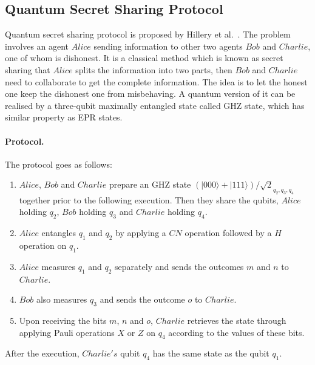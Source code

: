 \documentclass[runningheads]{llncs}
\begin{document}
\subsection{Quantum Secret Sharing Protocol}
Quantum secret sharing protocol is proposed by Hillery et al.~\cite{hillery1999quantum}. The problem involves an agent $Alice$ sending information to other two agents $Bob$ and $Charlie$, one of whom is dishonest. It is a classical method which is known as secret sharing that $Alice$ splits the information into two parts, then $Bob$ and $Charlie$ need to collaborate to get the complete information. The idea is to let the honest one keep the dishonest one from misbehaving. A quantum version of it can be realised by a three-qubit maximally entangled state called GHZ state, which has similar property as EPR states. 
\paragraph{Protocol.}
The protocol goes as follows:
\begin{enumerate}
	\item $Alice$, $Bob$ and $Charlie$ prepare an GHZ state $(|000\rangle+|111\rangle)/\sqrt{2}_{q_2,q_3,q_4}$ together prior to the following execution. Then they share the qubits, $Alice$ holding $q_2$, $Bob$ holding $q_3$ and $Charlie$ holding $q_4$.
	\item $Alice$ entangles $q_1$ and $q_2$ by applying a $CN$ operation followed by a $H$ operation on $q_1$.
	\item $Alice$ measures $q_1$ and $q_2$ separately and sends the outcomes $m$ and $n$ to $Charlie$.
	\item $Bob$ also measures $q_3$ and sends the outcome $o$ to $Charlie$.
	\item Upon receiving the bits $m$, $n$ and $o$, $Charlie$ retrieves the state through applying Pauli operations $X$ or $Z$ on $q_4$ according to the values of these bits.
\end{enumerate}
After the execution, $Charlie's$ qubit $q_4$ has the same state as the qubit $q_1$.
\end{document}

